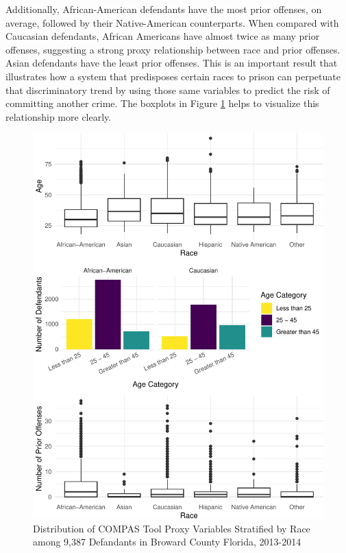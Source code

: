 \documentclass[12pt, twoside]{amherstthesis}
\begin{document}
Additionally, African-American defendants have the most prior offenses, on average, followed by their Native-American counterparts. When compared with Caucasian defendants, African Americans have almost twice as many prior offenses, suggesting a strong proxy relationship between race and prior offenses. Asian defendants have the least prior offenses. This is an important result that illustrates how a system that predisposes certain races to prison can perpetuate that discriminatory trend by using those same variables to predict the risk of committing another crime. The boxplots in Figure \ref{fig:ch3fig10} helps to visualize this relationship more clearly.
\begin{figure}

{\centering \includegraphics{Dasha-Asienga_StatThesis_files/figure-latex/ch3fig10-1} 

}

\caption{Distribution of COMPAS Tool Proxy Variables Stratified by Race among 9,387 Defandants in Broward County Florida, 2013-2014}\label{fig:ch3fig10}
\end{figure}
\end{document}
